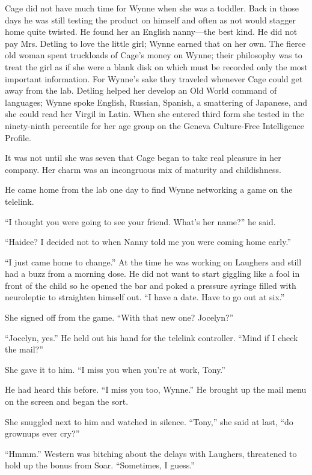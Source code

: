 Cage did not have much time for Wynne when she was a toddler. Back in those days he was still testing the product on himself and often as not would stagger home quite twisted. He found her an English nanny—the best kind. He did not pay Mrs. Detling to love the little girl; Wynne earned that on her own. The fierce old woman spent truckloads of Cage’s money on Wynne; their philosophy was to treat the girl as if she were a blank disk on which must be recorded only the most important information. For Wynne’s sake they traveled whenever Cage could get away from the lab. Detling helped her develop an Old World command of languages; Wynne spoke English, Russian, Spanish, a smattering of Japanese, and she could read her Virgil in Latin. When she entered third form she tested in the ninety-ninth percentile for her age group on the Geneva Culture-Free Intelligence Profile.

It was not until she was seven that Cage began to take real pleasure in her company. Her charm was an incongruous mix of maturity and childishness.

He came home from the lab one day to find Wynne networking a game on the telelink.

“I thought you were going to see your friend. What’s her name?” he said.

“Haidee? I decided not to when Nanny told me you were coming home early.”

“I just came home to change.” At the time he was working on Laughers and still had a buzz from a morning dose. He did not want to start giggling like a fool in front of the child so he opened the bar and poked a pressure syringe filled with neuroleptic to straighten himself out. “I have a date. Have to go out at six.”

She signed off from the game. “With that new one? Jocelyn?”

“Jocelyn, yes.” He held out his hand for the telelink controller. “Mind if I check the mail?”

She gave it to him. “I miss you when you’re at work, Tony.”

He had heard this before. “I miss you too, Wynne.” He brought up the mail menu on the screen and began the sort.

She snuggled next to him and watched in silence. “Tony,” she said at last, “do grownups ever cry?”

“Hmmm.” Western was bitching about the delays with Laughers, threatened to hold up the bonus from Soar. “Sometimes, I guess.”

